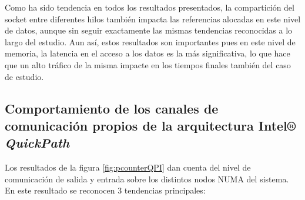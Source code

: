 Como ha sido tendencia en todos los resultados presentados, la compartición del socket entre diferentes hilos también impacta las referencias alocadas en este nivel de datos, aunque sin seguir exactamente las mismas tendencias reconocidas a lo largo del estudio. Aun así, estos resultados son importantes pues en este nivel de memoria, la latencia en el acceso a los datos es la más significativa, lo que hace que un alto tráfico de la misma impacte en los tiempos finales también del caso de estudio.

\subsection{Comportamiento de los canales de comunicación propios de la arquitectura Intel® \emph{QuickPath}}

Los resultados de la figura \ref{fig:pcounterQPI} dan cuenta del nivel de comunicación de salida y entrada sobre los distintos nodos NUMA del sistema. En este resultado se reconocen 3 tendencias principales:
